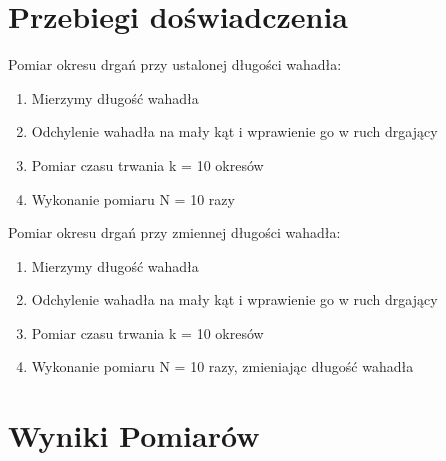 \documentclass[18pt, twoside]{article}
\begin{document}
\section{Przebiegi doświadczenia}
    Pomiar okresu drgań przy ustalonej długości wahadła:
    \begin{enumerate}
    	\item Mierzymy długość wahadła
    	\item Odchylenie wahadła na mały kąt i wprawienie go w ruch drgający
    	\item Pomiar czasu trwania k = 10 okresów
    	\item Wykonanie pomiaru N = 10 razy
    \end{enumerate}
    Pomiar okresu drgań przy zmiennej długości wahadła: 
    \begin{enumerate}
    	\item Mierzymy długość wahadła
    	\item Odchylenie wahadła na mały kąt i wprawienie go w ruch drgający
    	\item Pomiar czasu trwania k = 10 okresów
    	\item Wykonanie pomiaru N = 10 razy, zmieniając długość wahadła
    \end{enumerate}
\section{Wyniki Pomiarów}
\end{document}
